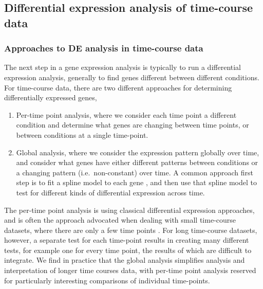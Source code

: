\documentclass[9pt,a4paper,]{extarticle}
\begin{document}
\hypertarget{differential-expression-analysis-of-time-course-data}{%
\subsection{Differential expression analysis of time-course data}\label{differential-expression-analysis-of-time-course-data}}

\hypertarget{approaches-to-de-analysis-in-time-course-data}{%
\subsubsection{Approaches to DE analysis in time-course data}\label{approaches-to-de-analysis-in-time-course-data}}

The next step in a gene expression analysis is typically to run a differential
expression analysis, generally to find genes different between different
conditions. For time-course data, there are two different approaches for
determining differentially expressed genes,

\begin{enumerate}
\def\labelenumi{\arabic{enumi})}
\item
  Per-time point analysis, where we consider each time point a different
  condition and determine what genes are changing between time points, or
  between conditions at a single time-point.
\item
  Global analysis, where we consider the expression pattern globally over
  time, and consider what genes have either different patterns between
  conditions or a changing pattern (i.e.~non-constant) over time. A common
  approach first step is to fit a spline model to each gene
  \citep{storey:significance}, and then use that spline model to test for different
  kinds of differential expression across time.
\end{enumerate}

The per-time point analysis is using classical differential expression
approaches, and is often the approach advocated when dealing with small
time-course datasets, where there are only a few time points \citep{ritchie:limma, robinson:edgeR, love:moderated} . For long time-course datasets, however, a
separate test for each time-point results in creating many different tests,
for example one for every time point, the results of which are difficult to
integrate. We find in practice that the global analysis simplifies analysis
and interpretation of longer time courses data, with per-time point analysis
reserved for particularly interesting comparisons of individual time-points.
\end{document}
